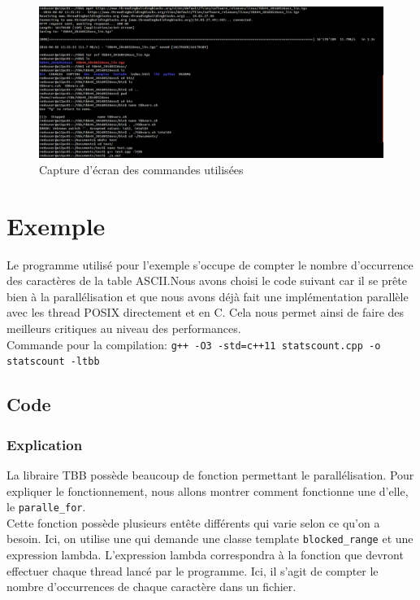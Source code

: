 \documentclass[10pt,a4paper]{article}
\begin{document}
\begin{figure}[hpl]
	\includegraphics[width=\textwidth]{images/installcommands.png}
	\caption{Capture d'écran des commandes utilisées}
\end{figure}

\newpage

\section{Exemple}
Le programme utilisé pour l'exemple s'occupe de compter le nombre d’occurrence des caractères de la table ASCII.Nous avons choisi le code suivant car il se prête bien à la parallélisation et que nous avons déjà fait une implémentation parallèle avec les thread POSIX directement et en C. Cela nous permet ainsi de faire des meilleurs critiques au niveau des performances.\\

Commande pour la compilation: \texttt{g++ -O3 -std=c++11 statscount.cpp -o statscount -ltbb}

\subsection{Code}


\subsubsection{Explication}
La libraire TBB possède beaucoup de fonction permettant le parallélisation. Pour expliquer le fonctionnement, nous allons montrer comment fonctionne une d'elle, le \texttt{paralle\_for}. \\

Cette fonction possède plusieurs entête différents qui varie selon ce qu'on a besoin. Ici, on utilise une qui demande une classe template \texttt{blocked\_range} et une expression lambda. L'expression lambda correspondra à la fonction que devront effectuer chaque thread lancé par le programme. Ici, il s'agit de compter le nombre d’occurrences de chaque caractère dans un fichier.
\end{document}
